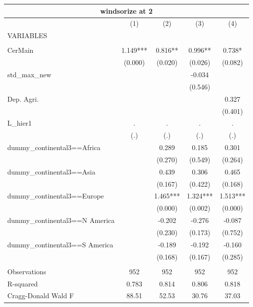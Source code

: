\begin{tabular}{lcccc}
\multicolumn{5}{c}{windsorize at 2} \\ \hline
 & (1) & (2) & (3) & (4) \\
VARIABLES &  &  &  &  \\ \hline
 &  &  &  &  \\
CerMain & 1.149*** & 0.816** & 0.996** & 0.738* \\
 & (0.000) & (0.020) & (0.026) & (0.082) \\
std\_max\_new &  &  & -0.034 &  \\
 &  &  & (0.546) &  \\
Dep. Agri. &  &  &  & 0.327 \\
 &  &  &  & (0.401) \\
L\_hier1 & . & . & . & . \\
 & (.) & (.) & (.) & (.) \\
dummy\_continental3==Africa &  & 0.289 & 0.185 & 0.301 \\
 &  & (0.270) & (0.549) & (0.264) \\
dummy\_continental3==Asia &  & 0.439 & 0.306 & 0.465 \\
 &  & (0.167) & (0.422) & (0.168) \\
dummy\_continental3==Europe &  & 1.465*** & 1.324*** & 1.513*** \\
 &  & (0.000) & (0.002) & (0.000) \\
dummy\_continental3==N America &  & -0.202 & -0.276 & -0.087 \\
 &  & (0.230) & (0.173) & (0.752) \\
dummy\_continental3==S America &  & -0.189 & -0.192 & -0.160 \\
 &  & (0.168) & (0.167) & (0.285) \\
 &  &  &  &  \\
Observations & 952 & 952 & 952 & 952 \\
R-squared & 0.783 & 0.814 & 0.806 & 0.818 \\
 Cragg-Donald Wald F & 88.51 & 52.53 & 30.76 & 37.03 \\ \hline
\end{tabular}
